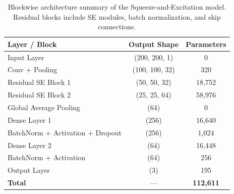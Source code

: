\begin{table}[H]
\centering
\scriptsize
\begin{tabular}{lcc}
    \toprule
    \textbf{Layer / Block} & \textbf{Output Shape} & \textbf{Parameters} \\
    \midrule
    Input Layer                          & (200, 200, 1)     & 0 \\
    Conv + Pooling                           & (100, 100, 32)    & 320 \\
    Residual SE Block 1                  & (50, 50, 32)      & 18,752 \\
    Residual SE Block 2                  & (25, 25, 64)      & 58,976 \\
    Global Average Pooling               & (64)              & 0 \\
    Dense Layer 1                        & (256)             & 16,640 \\
    BatchNorm + Activation + Dropout     & (256)             & 1,024 \\
    Dense Layer 2                        & (64)              & 16,448 \\
    BatchNorm + Activation               & (64)              & 256 \\
    Output Layer                         & (3)               & 195 \\
    \midrule
    \textbf{Total}                       & —                 & \textbf{112,611} \\
    \bottomrule
\end{tabular}
\caption{Blockwise architecture summary of the Squeeze-and-Excitation model. Residual blocks include SE modules, batch normalization, and skip connections.}
\label{tab:se_summary}
\end{table}

